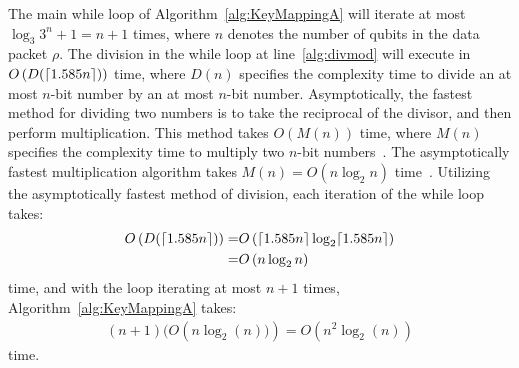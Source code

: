 The main while loop of Algorithm~\ref{alg:KeyMappingA} will iterate at most $\log_{3}3^n + 1 = n + 1$ times, where $n$ denotes the number of qubits in the data packet $\rho$. The division in the while loop at line~\ref{alg:divmod} will execute in $O\left(D(\lceil1.585 n\rceil)\right)$ time, where $D\left(n\right)$ specifies the complexity time to divide an at most $n$-bit number by an at most $n$-bit number. Asymptotically, the fastest method for dividing two numbers is to take the reciprocal of the divisor, and then perform multiplication. This method takes $O\left(M(n)\right)$ time, where $M\left(n\right)$ specifies the complexity time to multiply two $n$-bit numbers~\cite{FastDivision,granlund2010gnu}. The asymptotically fastest multiplication algorithm takes $M\left(n\right) = O\left(n\log_2 n\right)$ time~\cite{harvey2021integer}. Utilizing the asymptotically fastest method of division, each iteration of the while loop takes:
\begin{align}
O\left(D(\lceil1.585 n\rceil)\right) = &O\left(\lceil1.585 n\rceil\log_2 \lceil1.585 n\rceil\right)\\
= &O\left(n\log_2 n\right)
\end{align}
time, and with the loop iterating at most $n + 1$ times, Algorithm~\ref{alg:KeyMappingA} takes:
\begin{align}
(n + 1)(O\left(n \log_2(n))\right) = O\left(n^2 \log_2(n)\right)
\end{align}
time.

